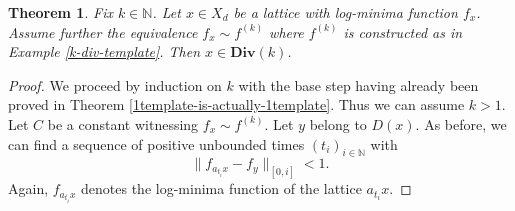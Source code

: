 \documentclass[reqno,11pt]{amsart}
\theoremstyle{plain}
\newtheorem{thm}{Theorem}[section]
\theoremstyle{definition}
\theoremstyle{remark}
\numberwithin{equation}{section}
\newcommand{\D}{\mathbf{Div}}
\newcommand{\N}{{\mathbb{N}}}
\begin{document}
\begin{thm}\label{existence-of-kdiv}
Fix $k \in \N$. 
Let $x \in X_d$ be a lattice with log-minima function $f_x$. Assume further the equivalence $f_x \sim f^{(k)}$ where $f^{(k)}$ is constructed as in Example \ref{k-div-template}.
Then $x \in \D(k)$.
\end{thm}
\begin{proof}
We proceed by induction on $k$ with the base step having already been proved in Theorem \ref{1template-is-actually-1template}. 
Thus we can assume $k>1$. Let $C$ be a constant witnessing $f_x \sim f^{(k)}$.
Let $y$ belong to $D(x)$. 
As before, we can find a sequence of positive unbounded times $(t_i)_{i \in \N}$ with 
\begin{equation}\label{k-div-y-iclose}
    \|f_{a_{t_i}x} - f_y\|_{[0,i]} < 1.
\end{equation}
Again, $f_{a_{t_i}x}$ denotes the log-minima function of the lattice $a_{t_i}x$.


\end{proof}
\end{document}
